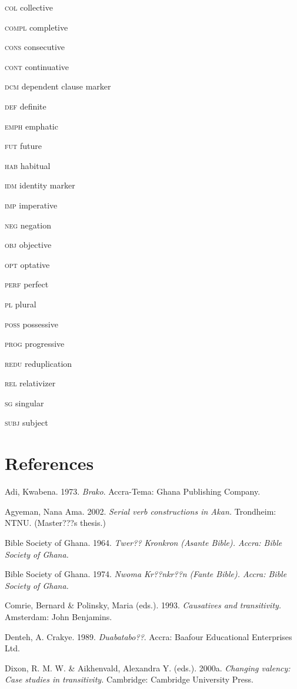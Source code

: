 \documentclass[output=paper]{langsci/langscibook}
\begin{document}
\textsc{col}   collective

\textsc{compl}  completive

\textsc{cons}  consecutive

\textsc{cont}  continuative

\textsc{dcm}   dependent clause marker

\textsc{def}   definite

\textsc{emph}  emphatic

\textsc{fut}  future

\textsc{hab}  habitual

\textsc{idm}  identity marker

\textsc{imp}  imperative

\textsc{neg}  negation

\textsc{obj}  objective

\textsc{opt}  optative

\textsc{perf}  perfect

\textsc{pl}  plural

\textsc{poss}  possessive

\textsc{prog}  progressive

\textsc{redu}  reduplication

\textsc{rel  }relativizer

\textsc{sg  }singular

\textsc{subj  }subject

\chapter{References}

Adi, Kwabena. 1973. \emph{Brako}. Accra-Tema: Ghana Publishing Company.

Agyeman, Nana Ama. 2002. \emph{Serial verb constructions in Akan.} Trondheim: NTNU. (Master???s thesis.)

Bible Society of Ghana. 1964. \emph{Twer?? Kronkron}\emph{\textup{ (}}\emph{Asante Bible}\emph{\textup{). Accra: Bible Society of Ghana.}}

Bible Society of Ghana. 1974. \emph{Nwoma Kr??nkr??n}\emph{\textup{ (}}\emph{Fante Bible}\emph{\textup{). Accra: Bible Society of Ghana.}}

Comrie, Bernard \& Polinsky, Maria (eds.). 1993. \textit{Causatives and transitivity.} Amsterdam: John Benjamins.

Denteh, A. Crakye. 1989. \emph{Duabatabo??}. Accra: Baafour Educational Enterprises Ltd.

Dixon, R. M. W. \& Aikhenvald, Alexandra Y. (eds.). 2000a. \textit{Changing valency: Case studies in transitivity.} Cambridge: Cambridge University Press.
\end{document}
